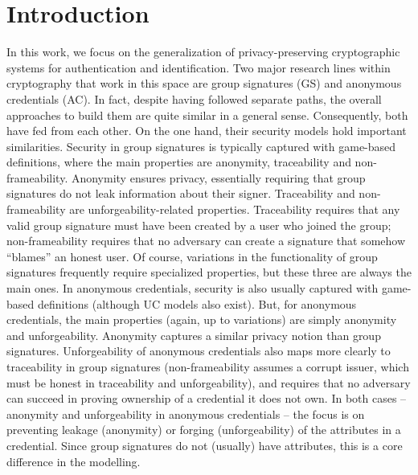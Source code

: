 \section{Introduction}
\label{sec:introduction}


In this work, we focus on the generalization of privacy-preserving cryptographic
systems for authentication and identification. Two major research lines within
cryptography that work in this space are group signatures (GS) and anonymous
credentials (AC). In fact, despite having followed separate paths, the overall
approaches to build them are quite similar in a general sense. Consequently,
both have fed from each other.
%
%
On the one hand, their security models hold important similarities. Security in
group signatures is typically captured with game-based definitions, where the
main properties are anonymity, traceability and non-frameability. Anonymity
ensures privacy, essentially requiring that group signatures do not leak
information about their signer. Traceability and non-frameability are
unforgeability-related properties. Traceability requires that any valid group
signature must have been created by a user who joined the group;
non-frameability requires that no adversary can create a signature that somehow
``blames'' an honest user. Of course, variations in the functionality of group
signatures frequently require specialized properties, but these three are always
the main ones. In anonymous credentials, security is also usually captured with
game-based definitions (although UC models also exist). But, for anonymous
credentials, the main properties (again, up to variations) are simply anonymity
and unforgeability. Anonymity captures a similar privacy notion than group
signatures. Unforgeability of anonymous credentials also maps more clearly to
traceability in group signatures (non-frameability assumes a corrupt issuer,
which must be honest in traceability and unforgeability), and requires that
no adversary can succeed in proving ownership of a credential it does not own.
In both cases -- anonymity and unforgeability in anonymous credentials -- the
focus is on preventing leakage (anonymity) or forging (unforgeability) of the
attributes in a credential. Since group signatures do not (usually) have
attributes, this is a core difference in the modelling.

